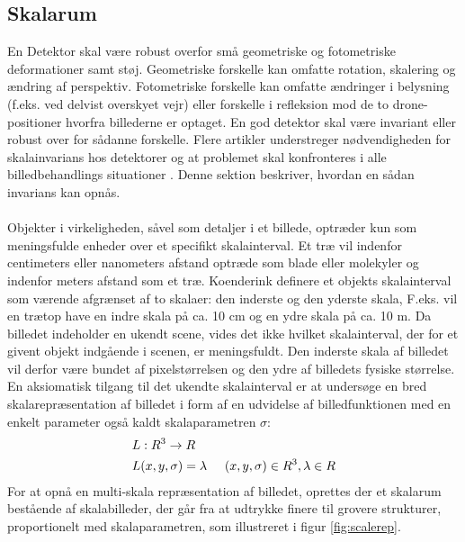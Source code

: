 \subsection{Skalarum}
En Detektor skal være robust overfor små geometriske og fotometriske deformationer samt støj. Geometriske forskelle kan omfatte rotation, skalering og ændring af perspektiv.  Fotometriske forskelle kan omfatte ændringer i belysning (f.eks. ved delvist overskyet vejr) eller forskelle i refleksion mod de to drone-positioner hvorfra billederne er optaget. En god detektor skal være invariant eller robust over for sådanne forskelle.  Flere artikler understreger nødvendigheden for skalainvarians hos detektorer og at problemet skal konfronteres i alle billedbehandlings situationer \cite{koen} \cite{blob} \cite{lindenscale}. Denne sektion beskriver, hvordan en sådan invarians kan opnås. \\ \\
Objekter i virkeligheden, såvel som detaljer i et billede, optræder kun som meningsfulde enheder over et specifikt skalainterval. Et træ vil indenfor centimeters eller nanometers afstand optræde som blade eller molekyler og indenfor meters afstand som et træ. Koenderink \cite{koen} definere et objekts skalainterval som værende afgrænset af to skalaer: den inderste og den yderste skala,  F.eks. vil en trætop have en indre skala på ca. 10 cm og en ydre skala på ca. 10 m. Da billedet indeholder en ukendt scene, vides det ikke hvilket skalainterval, der for et givent objekt indgående i scenen, er meningsfuldt. Den inderste skala af billedet vil derfor være bundet af pixelstørrelsen og den ydre af billedets fysiske størrelse. En aksiomatisk tilgang til det ukendte skalainterval er at undersøge en bred skalarepræsentation af billedet i form af en udvidelse af billedfunktionen med en enkelt parameter også kaldt skalaparametren $\sigma$:
\begin{equation}
\begin{split}
&L: R^3 \rightarrow R \\
&L(x,y,\sigma) = \lambda \hspace{0.5 cm} (x,y,\sigma)\in R^3, \lambda \in R
\end{split}
\end{equation}
For at opnå en multi-skala repræsentation af billedet, oprettes der et skalarum bestående af skalabilleder, der går fra at udtrykke finere til grovere strukturer, proportionelt med skalaparametren, som illustreret i figur \ref{fig:scalerep}. 
